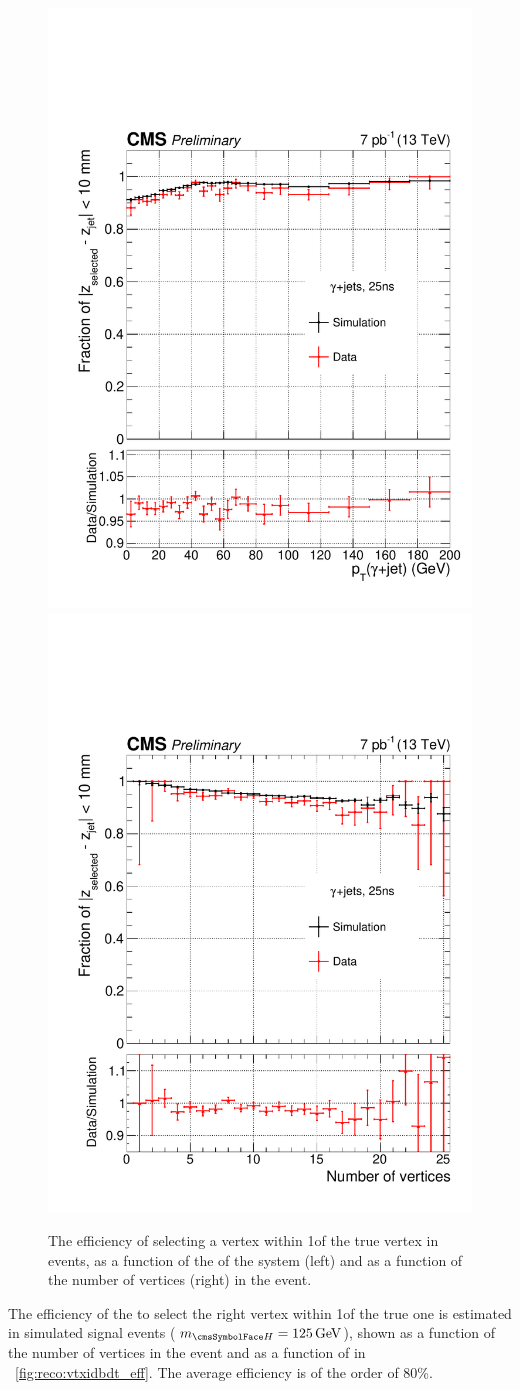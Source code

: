 \begin{figure}
\begin{center}
\includegraphics[width=0.49\linewidth]{recoFigures/last_gamma_jets_eff_vs_pT.pdf}
\includegraphics[width=0.49\linewidth]{recoFigures/last_gamma_jets_nVtx.pdf}
\caption{The efficiency of selecting a vertex within 1\cm of the true vertex in \gammaJet events, as a function of the \pT of the \gammaJet system (left) and as a function of the number of vertices (right) in the event.}
\label{fig:reco:vtx_if_eff_gjet_validation}
\end{center}
\end{figure}


The efficiency of the \VtxIdBdt to select the right vertex within 1\cm of the true one is estimated in simulated signal events ($\mH=125\GeV$), shown as a function of the number of vertices in the event and as a function of \pT in \Fig~\ref{fig:reco:vtxidbdt_eff}. The average efficiency is of the order of 80\%. 


